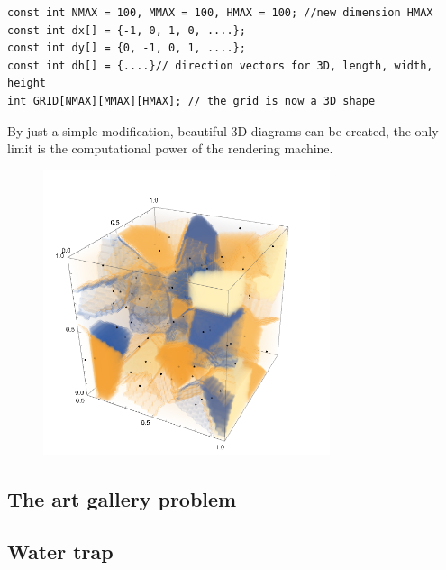 \documentclass[letterpaper]{article}
\begin{document}
\begin{lstlisting}
const int NMAX = 100, MMAX = 100, HMAX = 100; //new dimension HMAX
const int dx[] = {-1, 0, 1, 0, ....};
const int dy[] = {0, -1, 0, 1, ....};
const int dh[] = {....}// direction vectors for 3D, length, width, height
int GRID[NMAX][MMAX][HMAX]; // the grid is now a 3D shape
\end{lstlisting}

By just a simple modification, beautiful 3D diagrams can be created, the only limit is the computational power of the rendering machine.

\begin{figure} [h!]
\centering
\includegraphics[width=0.75\textwidth]{pngOfDiagrams/voronoi3.png}
\end{figure}


\newpage

\subsection{The art gallery problem}

\newpage

\subsection{Water trap}


\end{document}
